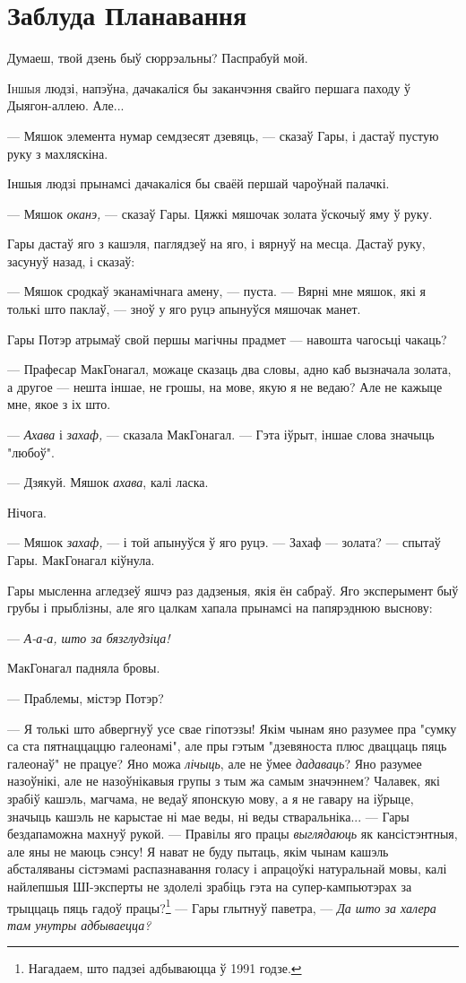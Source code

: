 \chapter{Заблуда Планавання}
\begin{chapterOpeningQuote}
    Думаеш, твой дзень быў сюррэальны? Паспрабуй мой.
\end{chapterOpeningQuote}

\lettrine{І}{ншыя} людзі, напэўна, дачакаліся бы заканчэння свайго першага
паходу ў Дыягон-аллею. Але...

--- Мяшок элемента нумар семдзесят дзевяць, --- сказаў Гары, і дастаў пустую 
руку з махляскіна.

Іншыя людзі прынамсі дачакаліся бы сваёй першай чароўнай палачкі.

--- Мяшок \emph{оканэ,} --- сказаў Гары. Цяжкі мяшочак золата ўскочыў яму ў руку.

Гары дастаў яго з кашэля, паглядзеў на яго, і вярнуў на месца. Дастаў руку, засунуў
назад, і сказаў:

--- Мяшок сродкаў эканамічнага амену, --- пуста. --- Вярні мне мяшок, які я толькі што паклаў, ---
зноў у яго руцэ апынуўся мяшочак манет.

Гары Потэр атрымаў свой першы магічны прадмет --- навошта чагосьці чакаць?

--- Прафесар МакГонагал, можаце сказаць два словы, адно каб вызначала золата, а
другое --- нешта іншае, не грошы, на мове, якую я не ведаю? Але не кажыце мне, 
якое з іх што.

--- \emph{Ахава} і \emph{захаф,} --- сказала МакГонагал. --- Гэта іўрыт, іншае 
слова значыць "любоў".

--- Дзякуй. Мяшок \emph{ахава}, калі ласка.

Нічога.

--- Мяшок \emph{захаф,} --- і той апынуўся ў яго руцэ. --- Захаф --- золата? --- 
спытаў Гары. МакГонагал кіўнула.

Гары мысленна агледзеў яшчэ раз дадзеныя, якія ён сабраў.
Яго эксперымент быў грубы і прыблізны, але яго цалкам хапала прынамсі на папярэднюю выснову:

--- \emph{А-а-а, што за бязглудзіца!}

МакГонагал падняла бровы.

--- Праблемы, містэр Потэр?

--- Я толькі што абвергнуў усе свае гіпотэзы! Якім чынам яно разумее пра "сумку 
са ста пятнаццаццю галеонамі", але пры гэтым "дзевяноста плюс дваццаць
пяць галеонаў" не працуе? Яно можа \emph{лічыць}, але не ўмее \emph{дадаваць}?
Яно разумее назоўнікі, але не назоўнікавыя групы з тым жа самым значэннем? Чалавек, які
зрабіў кашэль, магчама, не ведаў японскую мову, а я не гавару на іўрыце, значыць
кашэль не карыстае ні мае веды, ні веды стваральніка... --- Гары бездапаможна
махнуў рукой. --- Правілы яго працы \emph{выглядаюць} як кансістэнтныя, але яны 
не маюць сэнсу! Я нават не буду пытаць, якім чынам кашэль абсталяваны сістэмамі
распазнавання голасу і апрацоўкі натуральнай мовы, калі найлепшыя ШІ-эксперты
не здолелі зрабіць гэта на супер-кампьютэрах за трыццаць пяць гадоў 
працы?\footnote{{} Нагадаем, што падзеі адбываюцца ў 1991 годзе.} ---
Гары глытнуў паветра, --- \emph{Да што за халера там унутры адбываецца?}


